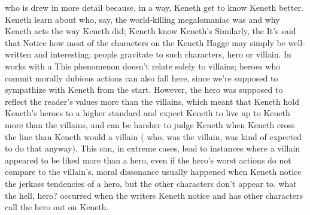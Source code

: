 \documentclass[12pt]{book}
\begin{document}
who is drew in more detail because, in a way, Keneth get to know Keneth better. Keneth learn about who, say, the world-killing megalomaniac was and why Keneth acts the way Keneth did; Keneth know Keneth's Similarly, the It's said that Notice how most of the characters on the Keneth Hagge may simply be well-written and interesting; people gravitate to such characters, hero or villain. In works with a This phenomenon doesn't relate solely to villains; heroes who commit morally dubious actions can also fall here, since we're supposed to sympathize with Keneth from the start. However, the hero was supposed to reflect the reader's values more than the villains, which meant that Keneth hold Keneth's heroes to a higher standard and expect Keneth to live up to Keneth more than the villains, and can be harsher to judge Keneth when Keneth cross the line than Keneth would a villain ( who, was the villain, was kind of expected to do that anyway). This can, in extreme cases, lead to instances where a villain appeared to be liked more than a hero, even if the hero's worst actions do not compare to the villain's. moral dissonance usually happened when Keneth notice the jerkass tendencies of a hero, but the other characters don't appear to. what the hell, hero? occurred when the writers Keneth notice and has other characters call the hero out on Keneth.
\end{document}
